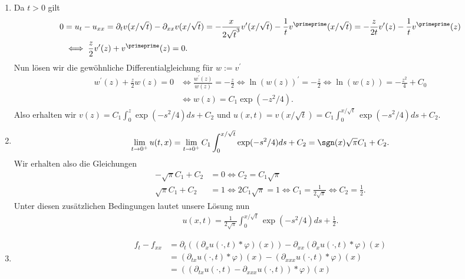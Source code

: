\begin{solution}
\phantom{}
\begin{enumerate}[label = (\roman*)]
  \item Da $t > 0$ gilt
  \begin{align*}
    0 &= u_t - u_{xx} = \partial_t v(x/\sqrt{t}) - \partial_{xx}v(x/\sqrt{t})
    = -\frac{x}{2\sqrt{t}^3}v^{\prime}(x/\sqrt{t}) - \frac{1}{t}v^{\primeprime}(x/\sqrt{t})
    = - \frac{z}{2t}v^{\prime}(z) - \frac{1}{t}v^{\primeprime}(z) \\
    &\iff \frac{z}{2}v^{\prime}(z) + v^{\primeprime}(z) = 0.
  \end{align*}
  Nun lösen wir die gewöhnliche Differentialgleichung für $w := v^{\prime}$
  \begin{align*}
    w^{\prime}(z) + \frac{z}{2}w(z) = 0 &\iff \frac{w^{\prime}(z)}{w(z)} = -\frac{z}{2}
    \iff \ln(w(z))^{\prime} = -\frac{z}{2} \iff \ln(w(z)) = -\frac{z^2}{4} + C_0 \\
    &\iff w(z) = C_1\exp\left(-z^2/4\right).
  \end{align*}
  Also erhalten wir $v(z) = C_1\int_0^z \exp(-s^2/4) ds + C_2$ und
  $u(x,t) = v(x/\sqrt{t}) = C_1\int_0^{x/\sqrt{t}} \exp(-s^2/4) ds + C_2$.
  \item
  \begin{align*}
    \lim_{t \to 0^+} u(t,x) = \lim_{t \to 0^+} C_1\int_0^{x/\sqrt{t}} \exp(-s^2/4) ds + C_2
    = \sgn(x)\sqrt{\pi}C_1 + C_2.
  \end{align*}
  Wir erhalten also die Gleichungen
  \begin{align*}
    -\sqrt{\pi}C_1 + C_2 &= 0   \iff C_2 = C_1\sqrt{\pi}\\
    \sqrt{\pi}C_1 + C_2 &= 1 \iff 2C_1\sqrt{\pi} = 1 \iff C_1 = \frac{1}{2\sqrt{\pi}}
    \iff C_2 = \frac{1}{2}.
  \end{align*}
  Unter diesen zusätzlichen Bedingungen lautet unsere Lösung nun
  \begin{align*}
    u(x,t) = \frac{1}{2\sqrt{\pi}}\int_0^{x/\sqrt{t}}\exp(-s^2/4)ds + \frac{1}{2}.
  \end{align*}
  \item
  \begin{align*}
    f_t - f_{xx} &= \partial_t((\partial_x u(\cdot,t)\ast \varphi)(x))
    - \partial_{xx}(\partial_x u(\cdot,t)\ast \varphi)(x) \\
    &= (\partial_{tx} u(\cdot,t) \ast \varphi)(x) - (\partial_{xxx} u(\cdot,t) \ast \varphi)(x) \\
    &= ((\partial_{tx} u(\cdot,t) - \partial_{xxx} u(\cdot,t)) \ast \varphi)(x) \\

\end{align*}
\end{enumerate}
\end{solution}
